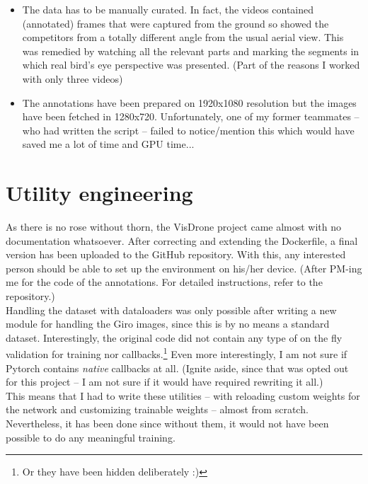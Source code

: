 \documentclass{article}
\begin{document}
\begin{itemize}
    \item The data has to be manually curated. In fact, the videos contained (annotated) frames that were captured from the ground so showed the competitors from a totally different angle from the usual aerial view. This was remedied by watching all the relevant parts and marking the segments in which real bird's eye perspective was presented. (Part of the reasons I worked with only three videos)
    
    \item The annotations have been prepared on 1920x1080 resolution but the images have been fetched in 1280x720. Unfortunately, one of my former teammates \--- who had written the script \--- failed to notice/mention this which would have saved me a lot of time and GPU time...
\end{itemize}


\section{Utility engineering}

As there is no rose without thorn, the VisDrone project came almost with no documentation whatsoever. After correcting and extending the Dockerfile, a final version has been uploaded to the GitHub repository. With this, any interested person should be able to set up the environment on his/her device. (After PM-ing me for the code of the annotations. For detailed instructions, refer to the repository.)\\

Handling the dataset with dataloaders was only possible after writing a new module for handling the Giro images, since this is by no means a standard dataset. Interestingly, the original code did not contain any type of on the fly validation for training nor callbacks.\footnote{Or they have been hidden deliberately :) } Even more interestingly, I am not sure if Pytorch contains \textit{native} callbacks at all. (Ignite aside, since that was opted out for this project \--- I am not sure if it would have required rewriting it all.)\\

This means that I had to write these utilities \--- with reloading custom weights for the network and customizing trainable weights \--- almost from scratch. Nevertheless, it has been done since without them, it would not have been possible to do any meaningful training.\\
\end{document}
